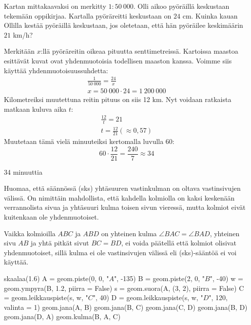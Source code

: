 \begin{esimerkki}
Kartan mittakaavaksi on merkitty $1:50\ 000$. Olli aikoo pyöräillä keskustaan tekemään
oppikirjaa. Kartalla pyöräreitti keskustaan on $24$ cm. Kuinka kauan Ollilla kestää
pyöräillä keskustaan, jos oletetaan, että hän pyöräilee keskimäärin $21$ km/h?
\begin{esimratk}
Merkitään $x$:llä pyöräreitin oikeaa pituutta senttimetreissä.
Kartoissa maastoa esittävät kuvat ovat yhdenmuotoisia todellisen maaston kanssa. Voimme
siis käyttää yhdenmuotoisuussuhdetta:
\begin{align*}
\frac{1}{50\ 000} = \frac{24}{x} \\
x = 50\ 000 \cdot 24 = 1\ 200\ 000
\end{align*}
Kilometreiksi muutettuna reitin pituus on siis 12 km. Nyt voidaan ratkaista matkaan kuluva
aika $t$:
\begin{align*}
\frac{12}{t} = 21 \\
t = \frac{12}{21} (\approx 0,57)
\end{align*}
Muutetaan tämä vielä minuuteiksi kertomalla luvulla 60:
\[
60 \cdot \frac{12}{21} = \frac{240}{7} \approx 34
\]
\end{esimratk}
\begin{esimvast}
34 minuuttia
\end{esimvast}
\end{esimerkki}

Huomaa, että säännössä (sks) yhtäsuuren vastinkulman on oltava vastinsivujen välissä. On
nimittäin mahdollista, että kahdella kolmiolla on kaksi keskenään verrannolista sivua
ja yhtäsuuri kulma toisen sivun vieressä, mutta kolmiot eivät kuitenkaan ole yhdenmuotoiset.

\begin{esimerkki}
Vaikka kolmioilla $ABC$ ja $ABD$ on yhteinen kulma $\angle BAC = \angle BAD$, yhteinen sivu $AB$ ja yhtä pitkät sivut $BC = BD$, ei voida päätellä että kolmiot olisivat yhdenmuotoiset, sillä kulma ei ole vastinsivujen välissä eli (sks)-sääntöä ei voi käyttää.

\begin{kuva}
skaalaa(1.6)
A = geom.piste(0, 0, "$A$", -135)
B = geom.piste(2, 0, "$B$", -40)
w = geom.ympyra(B, 1.2, piirra = False)
s = geom.suora(A, (3, 2), piirra = False)
C = geom.leikkauspiste(s, w, "$C$", 40)
D = geom.leikkauspiste(s, w, "$D$", 120, valinta = 1)
geom.jana(A, B)
geom.jana(B, C)
geom.jana(C, D)
geom.jana(B, D)
geom.jana(D, A)
geom.kulma(B, A, C)
\end{kuva}

\end{esimerkki}

